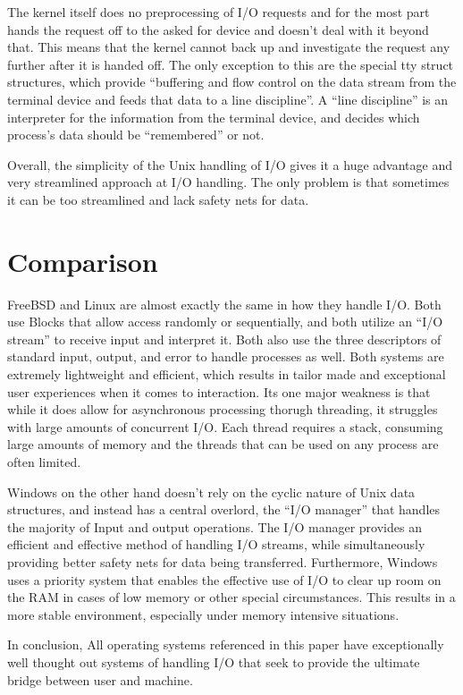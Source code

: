 \documentclass[onecolumn, draftclsnofoot,10pt, compsoc]{IEEEtran}
\begin{document}
The kernel itself does no preprocessing of I/O requests and for the most part hands the request off to the asked for device and doesn’t deal with it beyond that. This means that the kernel cannot back up and investigate the request any further after it is handed off. The only exception to this are the special tty struct structures, which provide “buffering and flow control on the data stream from the terminal device and feeds that data to a line discipline”\cite{Memman}. A “line discipline” is an interpreter for the information from the terminal device, and decides which process’s data should be “remembered” or not.
    
Overall, the simplicity of the Unix handling of I/O gives it a huge advantage and very streamlined approach at I/O handling. The only problem is that sometimes it can be too streamlined and lack safety nets for data. 


	
\section{Comparison}
FreeBSD and Linux are almost exactly  the same in how they handle I/O. Both use Blocks that allow access randomly or sequentially, and both utilize an “I/O stream” to receive input and interpret it. Both also use the three descriptors of standard input, output, and error to handle processes as well. Both systems are extremely lightweight and efficient, which results in tailor made and exceptional user experiences when it comes to interaction. Its one major weakness is that while it does allow for asynchronous processing thorugh threading, it struggles with large amounts of concurrent I/O. Each thread requires a stack, consuming large amounts of memory and the threads that can be used on any process are often limited. 

Windows on the other hand doesn’t rely on the cyclic nature of Unix data structures, and instead has a central overlord, the “I/O manager” that handles the majority of Input and output operations. The I/O manager provides an efficient and effective method of handling I/O streams, while simultaneously providing better safety nets for data being transferred. Furthermore, Windows uses a priority system that enables the effective use of I/O to clear up room on the RAM in cases of low memory or other special circumstances. This results in a more stable environment, especially under memory intensive situations. 

In conclusion, All operating systems referenced in this paper have exceptionally well thought out systems of handling I/O that seek to provide the ultimate bridge between user and machine. 
\end{document}
